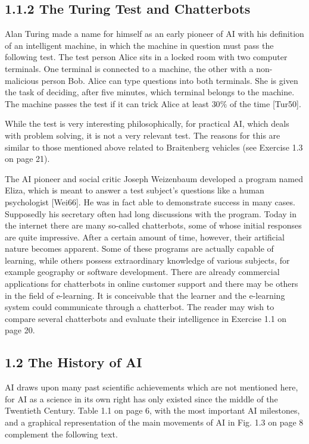 \documentclass[10pt]{article}
\begin{document}
\subsection*{1.1.2 The Turing Test and Chatterbots}
Alan Turing made a name for himself as an early pioneer of AI with his definition of an intelligent machine, in which the machine in question must pass the following test. The test person Alice sits in a locked room with two computer terminals. One terminal is connected to a machine, the other with a non-malicious person Bob. Alice can type questions into both terminals. She is given the task of deciding, after five minutes, which terminal belongs to the machine. The machine passes the test if it can trick Alice at least $30 \%$ of the time [Tur50].

While the test is very interesting philosophically, for practical AI, which deals with problem solving, it is not a very relevant test. The reasons for this are similar to those mentioned above related to Braitenberg vehicles (see Exercise 1.3 on page 21).

The AI pioneer and social critic Joseph Weizenbaum developed a program named Eliza, which is meant to answer a test subject's questions like a human psychologist [Wei66]. He was in fact able to demonstrate success in many cases. Supposedly his secretary often had long discussions with the program. Today in the internet there are many so-called chatterbots, some of whose initial responses are quite impressive. After a certain amount of time, however, their artificial nature becomes apparent. Some of these programs are actually capable of learning, while others possess extraordinary knowledge of various subjects, for example geography or software development. There are already commercial applications for chatterbots in online customer support and there may be others in the field of e-learning. It is conceivable that the learner and the e-learning system could communicate through a chatterbot. The reader may wish to compare several chatterbots and evaluate their intelligence in Exercise 1.1 on page 20.

\subsection*{1.2 The History of AI}
AI draws upon many past scientific achievements which are not mentioned here, for AI as a science in its own right has only existed since the middle of the Twentieth Century. Table 1.1 on page 6, with the most important AI milestones, and a graphical representation of the main movements of AI in Fig. 1.3 on page 8 complement the following text.
\end{document}
